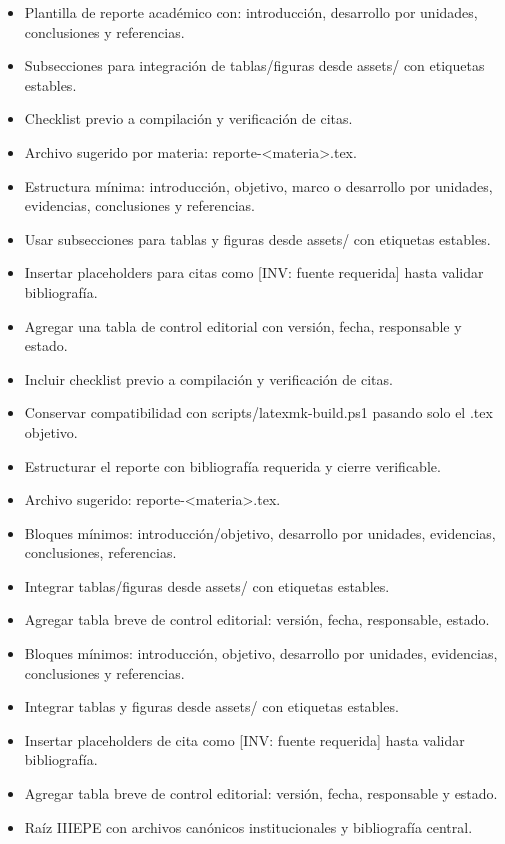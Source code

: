 \documentclass[12pt]{article}
\begin{document}
\begin{itemize}[leftmargin=*]
  \item Plantilla de reporte académico con: introducción, desarrollo por unidades, conclusiones y referencias.
  \item Subsecciones para integración de tablas/figuras desde assets/ con etiquetas estables.
  \item Checklist previo a compilación y verificación de citas.
  \item Archivo sugerido por materia: reporte-<materia>.tex.
  \item Estructura mínima: introducción, objetivo, marco o desarrollo por unidades, evidencias, conclusiones y referencias.
  \item Usar subsecciones para tablas y figuras desde assets/ con etiquetas estables.
  \item Insertar placeholders para citas como [INV: fuente requerida] hasta validar bibliografía.
  \item Agregar una tabla de control editorial con versión, fecha, responsable y estado.
  \item Incluir checklist previo a compilación y verificación de citas.
  \item Conservar compatibilidad con scripts/latexmk-build.ps1 pasando solo el .tex objetivo.
  \item Estructurar el reporte con bibliografía requerida y cierre verificable.
  \item Archivo sugerido: reporte-<materia>.tex.
  \item Bloques mínimos: introducción/objetivo, desarrollo por unidades, evidencias, conclusiones, referencias.
  \item Integrar tablas/figuras desde assets/ con etiquetas estables.
  \item Agregar tabla breve de control editorial: versión, fecha, responsable, estado.
  \item Bloques mínimos: introducción, objetivo, desarrollo por unidades, evidencias, conclusiones y referencias.
  \item Integrar tablas y figuras desde assets/ con etiquetas estables.
  \item Insertar placeholders de cita como [INV: fuente requerida] hasta validar bibliografía.
  \item Agregar tabla breve de control editorial: versión, fecha, responsable y estado.
  \item Raíz IIIEPE con archivos canónicos institucionales y bibliografía central.

\end{itemize}
\end{document}
